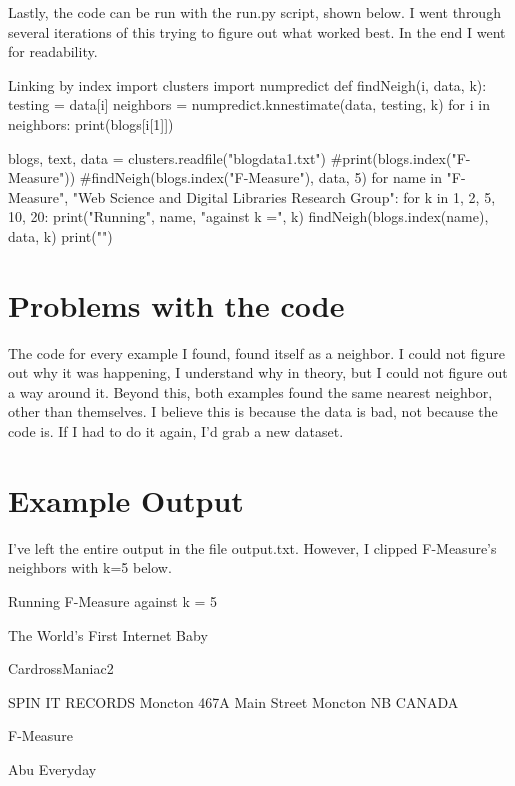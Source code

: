 \documentclass[11pt]{report}
\begin{document}
	Lastly, the code can be run with the run.py script, shown below. I went through several iterations of this trying to figure out what worked best. In the end I went for readability.
	
	\begin{mylisting}{Linking by index}
import clusters
import numpredict
def findNeigh(i, data, k):
    testing = data[i]
    neighbors = numpredict.knnestimate(data, testing, k)
    for i in neighbors:
        print(blogs[i[1]])


blogs, text, data = clusters.readfile("blogdata1.txt")
#print(blogs.index("F-Measure"))
#findNeigh(blogs.index("F-Measure"), data, 5)
for name in "F-Measure", "Web Science and Digital Libraries Research Group":
    for k in 1, 2, 5, 10, 20:
        print("Running", name, "against k =", k)
        findNeigh(blogs.index(name), data, k)
        print("\n\n")

\end{mylisting}
\section{Problems with the code}

The code for every example I found, found itself as a neighbor. I could not figure out why it was happening, I understand why in theory, but I could not figure out a way around it. Beyond this, both examples found the same nearest neighbor, other than themselves. I believe this is because the data is bad, not because the code is. If I had to do it again, I'd grab a new dataset.

\section{Example Output}

I've left the entire output in the file output.txt. However, I clipped F-Measure's neighbors with k=5 below.

Running F-Measure against k = 5

The World's First Internet Baby

CardrossManiac2

SPIN IT RECORDS Moncton 467A Main Street Moncton NB CANADA

F-Measure

Abu Everyday
\end{document}
